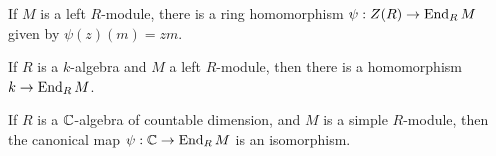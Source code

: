   \begin{prop}
    If $M$ is a left $R$-module, there is a ring homomorphism
    $\psi:Z(R)\to\operatorname{End}_R{M}$ given by $\psi(z)(m)=zm$.
  \end{prop}

  \begin{cor}
    If $R$ is a $k$-algebra and $M$ a left $R$-module, then there is a
    homomorphism $k \to\operatorname{End}_R{M}$.
  \end{cor}

  \begin{thm}
    If $R$ is a $\mathbb{C}$-algebra of countable dimension, and $M$ is a simple
    $R$-module, then the canonical map $\psi:\mathbb{C} \to \operatorname{End}_R{M}$ is an
    isomorphism.
  \end{thm}
